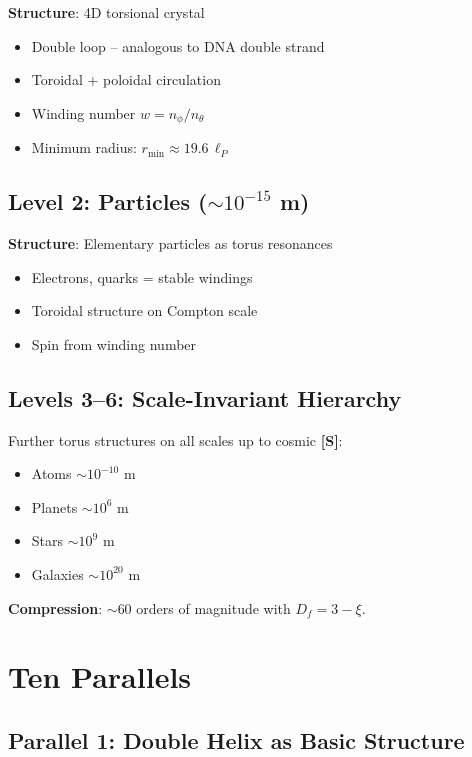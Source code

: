 	\textbf{Structure}: 4D torsional crystal
	\begin{itemize}
		\item Double loop -- analogous to DNA double strand
		\item Toroidal + poloidal circulation
		\item Winding number $w = n_\phi / n_\theta$
		\item Minimum radius: $r_{\min} \approx 19.6\,\ell_P$
	\end{itemize}

	\subsection{Level 2: Particles ($\sim 10^{-15}$ m)}

	\textbf{Structure}: Elementary particles as torus resonances
	\begin{itemize}
		\item Electrons, quarks = stable windings
		\item Toroidal structure on Compton scale
		\item Spin from winding number
	\end{itemize}

	\subsection{Levels 3--6: Scale-Invariant Hierarchy}

	Further torus structures on all scales up to cosmic \textbf{[S]}:
	\begin{itemize}
		\item Atoms $\sim 10^{-10}$ m
		\item Planets $\sim 10^{6}$ m  
		\item Stars $\sim 10^{9}$ m
		\item Galaxies $\sim 10^{20}$ m
	\end{itemize}

	\textbf{Compression}: $\sim 60$ orders of magnitude with $D_f = 3-\xi$.

	\section{Ten Parallels}

	\subsection{Parallel 1: Double Helix as Basic Structure}

